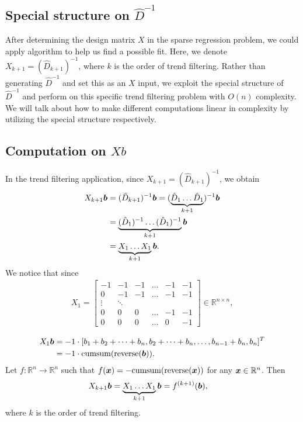 \subsection{Special structure on $\hat{D}^{-1}$}
After determining the design matrix $X$ in the sparse regression problem, we could apply \susie algorithm to help us find a possible fit. Here, we denote $X_{k+1} = (\hat{D}_{k+1})^{-1}$, where $k$ is the order of trend filtering. Rather than generating $\hat{D}^{-1}$ and set this as an $X$ input, we exploit the special structure of $\hat{D}^{-1}$ and perform \susie on this specific trend filtering problem with $O(n)$ complexity. We will talk about how to make different computations linear in complexity by utilizing the special structure respectively. 

\subsection{Computation on $Xb$} \label{Computation on Xb}
In the trend filtering application, since $X_{k+1} = (\hat{D}_{k+1})^{-1}$, we obtain
\begin{align}
X_{k+1} \bm b & = (\hat{D}_{k+1})^{-1} \bm b = (\underbrace{\hat{D}_{1}\dots \hat{D}_{1}}_{k+1})^{-1} \bm b \\
 & = \underbrace{(\hat{D}_{1})^{-1} \dots (\hat{D}_{1})^{-1}}_{k+1} \bm b \\
 & = \underbrace{X_1 \dots X_1}_{k+1} \bm b.
\end{align}
We notice that since 
\begin{align}
X_1 = \begin{bmatrix} 
    -1 & -1 & -1 & \dots & -1 & -1\\
    0 & -1 & -1 & \dots & -1 & -1\\
    \vdots & \ddots & \\
    0 & 0 & 0 & \dots & -1 & -1\\
    0 & 0 & 0 & \dots & 0 & -1
    \end{bmatrix}
    \in \mathbb{R}^{n\times n},
\end{align}
 
\begin{align}
X_1 \bm b & = -1 \cdot [b_1+b_2+\dots+b_n, b_2+\dots+b_n, \dots, b_{n-1}+b_n, b_n]^T \\
& = -1 \cdot \text{cumsum}(\text{reverse}(\bm b)) .
\end{align}
Let $f: \mathbb{R}^n \to \mathbb{R}^n$ such that $f(\bm x)= -\text{cumsum}(\text{reverse}(\bm x))$ for any $\bm x \in \mathbb{R}^n$. Then
\begin{align}
X_{k+1} \bm b & = \underbrace{X_1 \dots X_1}_{k+1} \bm b = f^{(k+1)}(\bm b),
\end{align}
where $k$ is the order of trend filtering. 

